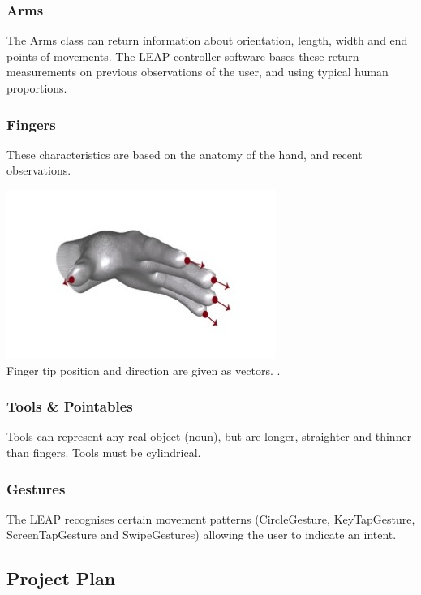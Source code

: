 \documentclass[a4paper, 11pt]{article}
\begin{document}
\subsubsection{Arms}
The Arms class can return information about orientation, length, width and end points of movements. The LEAP controller software bases these return measurements on previous observations of the user, and using typical human proportions.

\subsubsection{Fingers}
These characteristics are based on the anatomy of the hand, and recent observations. 

\begin{center}
\includegraphics[scale=0.7]{fingers}\\
Finger tip position and direction are given as vectors. \cite{leap}.
\end{center}


\subsubsection{Tools \& Pointables}
Tools can represent any real object (noun), but are longer, straighter and thinner than fingers. Tools must be cylindrical.

\subsubsection{Gestures}
The LEAP recognises certain movement patterns (CircleGesture, KeyTapGesture, ScreenTapGesture and SwipeGestures) allowing the user to indicate an intent.


\subsection{Project Plan}\label{plan}
\end{document}
